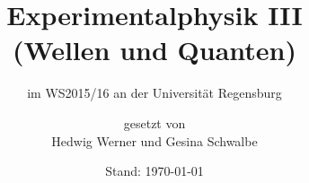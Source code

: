 \usepackage[utf8]{inputenc}
\usepackage[T1]{fontenc}
\usepackage{babel}
\usepackage{csquotes}
\usepackage{lmodern}
\usepackage{microtype}
\usepackage{makeidx}
\makeindex
%
% 
\usepackage[intoc]{nomencl}
\makenomenclature
\usepackage[backend=biber]{biblatex}


\usepackage{color}

\usepackage{amsmath}
\usepackage{mathtools}
\usepackage{amssymb}
\usepackage{dsfont}
\usepackage{amsthm}
\usepackage[
output-decimal-marker={,},
exponent-product=\cdot,
per-mode=fraction]
{siunitx}
\usepackage{booktabs}
\usepackage{enumerate}

\usepackage[%
pdftitle={Experimentalphysik III (Wellen und Quanten)},
pdfauthor={Hedwig Werner}]%
{hyperref}
\usepackage{tabularx}
\usepackage{graphicx}
\usepackage{wrapfig}
\usepackage{gensymb}

\setcounter{secnumdepth}{4}
\renewcommand{\theparagraph}{\alph{paragraph})} 

\subject{Vorlesungsmitschrift}
\title{Experimentalphysik III\\ (Wellen und Quanten)}
\subtitle{im WS2015/16 an der Universität Regensburg}
\date{Stand: \today}
\author{{\Large gesetzt von}\\ Hedwig Werner und Gesina Schwalbe}



